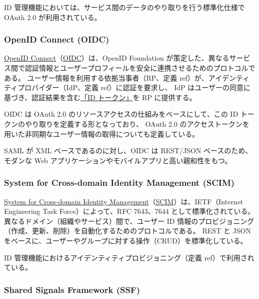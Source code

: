 \documentclass[uplatex]{jsarticle}
\def\ref#1{ref}%
\def\label#1{}%
\begin{document}
ID 管理機能においては、サービス間のデータのやり取りを行う標準化仕様で OAuth 2.0 が利用されている。

\subsubsection{OpenID Connect (OIDC)}

\begin{dfn}\label{dfn:ch5-oidc}
\underline{OpenID Connect}（\underline{OIDC}）は、OpenID Foundation が策定した、異なるサービス間で認証情報とユーザープロフィールを安全に連携させるためのプロトコルである。
ユーザー情報を利用する依拠当事者（RP、定義 \ref{dfn:rp}）が、アイデンティティプロバイダー（IdP、定義 \ref{dfn:idp}）に認証を要求し、
IdP はユーザーの同意に基づき、認証結果を含む\underline{「ID トークン」}を RP に提供する。
\end{dfn}

OIDC は OAuth 2.0 のリソースアクセスの仕組みをベースにして、この ID トークンのやり取りを定義する形となっており、
OAuth 2.0 のアクセストークンを用いた非同期なユーザー情報の取得についても定義している。

SAML が XML ベースであるのに対し、OIDC は REST/JSON ベースのため、モダンな Web アプリケーションやモバイルアプリと高い親和性をもつ。

\subsubsection{System for Cross-domain Identity Management (SCIM)}

\begin{dfn}[SCIM]\label{dfn:ch5-scim}
\underline{System for Cross-domain Identity Management}（\underline{SCIM}）は、IETF（Internet Engineering Task Force）によって、RFC 7643、7644 として標準化されている。
異なるドメイン（組織やサービス）間で、ユーザー ID 情報のプロビジョニング（作成、更新、削除）を自動化するためのプロトコルである。
REST と JSON をベースに、ユーザーやグループに対する操作（CRUD）を標準化している。
\end{dfn}

ID 管理機能におけるアイデンティティプロビジョニング（定義 \ref{dfn:identity-provisioning}）で利用されている。

\subsubsection{Shared Signals Framework (SSF)}
\end{document}
